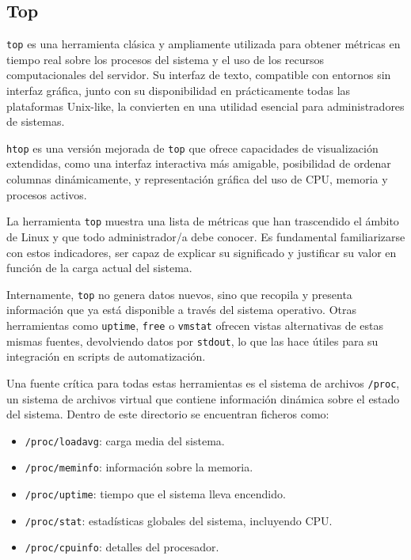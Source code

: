 \subsection{Top}

\texttt{top} es una herramienta clásica y ampliamente utilizada para obtener métricas en tiempo real sobre los procesos del sistema y el uso de los recursos computacionales del servidor. Su interfaz de texto, compatible con entornos sin interfaz gráfica, junto con su disponibilidad en prácticamente todas las plataformas Unix-like, la convierten en una utilidad esencial para administradores de sistemas.

\texttt{htop} es una versión mejorada de \texttt{top} que ofrece capacidades de visualización extendidas, como una interfaz interactiva más amigable, posibilidad de ordenar columnas dinámicamente, y representación gráfica del uso de CPU, memoria y procesos activos.

La herramienta \texttt{top} muestra una lista de métricas que han trascendido el ámbito de Linux y que todo administrador/a debe conocer. Es fundamental familiarizarse con estos indicadores, ser capaz de explicar su significado y justificar su valor en función de la carga actual del sistema.

Internamente, \texttt{top} no genera datos nuevos, sino que recopila y presenta información que ya está disponible a través del sistema operativo. Otras herramientas como \texttt{uptime}, \texttt{free} o \texttt{vmstat} ofrecen vistas alternativas de estas mismas fuentes, devolviendo datos por \texttt{stdout}, lo que las hace útiles para su integración en scripts de automatización.

Una fuente crítica para todas estas herramientas es el sistema de archivos \texttt{/proc}, un sistema de archivos virtual que contiene información dinámica sobre el estado del sistema. Dentro de este directorio se encuentran ficheros como:

\begin{itemize}
  \item \texttt{/proc/loadavg}: carga media del sistema.
  \item \texttt{/proc/meminfo}: información sobre la memoria.
  \item \texttt{/proc/uptime}: tiempo que el sistema lleva encendido.
  \item \texttt{/proc/stat}: estadísticas globales del sistema, incluyendo CPU.
  \item \texttt{/proc/cpuinfo}: detalles del procesador.
\end{itemize}

